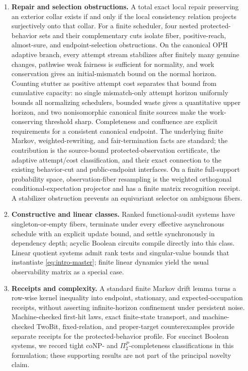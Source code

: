 \documentclass[11pt]{article}
\theoremstyle{definition}
\theoremstyle{remark}
\numberwithin{equation}{section}
\begin{document}
\begin{enumerate}[label=\textbf{C\arabic*.},leftmargin=3.2em]
\item \textbf{Repair and selection obstructions.}
A total exact local repair preserving an exterior collar exists if and only if the local consistency relation projects surjectively onto that collar.  For a finite scheduler, four nested protected-behavior sets and their complementary cuts isolate fiber, positive-reach, almost-sure, and endpoint-selection obstructions.  On the canonical OPH adaptive branch, every attempt stream stabilizes after finitely many genuine changes, pathwise weak fairness is sufficient for normality, and work conservation gives an initial-mismatch bound on the normal horizon.  Counting stutter as positive attempt cost separates that bound from cumulative capacity: no single mismatch-only attempt horizon uniformly bounds all normalizing schedulers, bounded waste gives a quantitative upper horizon, and two nonisomorphic canonical finite sources make the work-conserving threshold sharp.  Completeness and confluence are explicit requirements for a consistent canonical endpoint.  The underlying finite Markov, weighted-rewriting, and fair-termination facts are standard; the contribution is the source-bound protected-observation certificate, the adaptive attempt/cost classification, and their exact connection to the existing behavior-cut and public-endpoint interfaces.  On a finite full-support probability space, observation-fiber resampling is the weighted orthogonal conditional-expectation projector and has a finite matrix recognition receipt.  A stabilizer obstruction prevents an equivariant selector on ambiguous fibers.

\item \textbf{Constructive and linear classes.}
Ranked functional-audit systems have singleton-or-empty fibers, terminate under every effective asynchronous schedule with an explicit update bound, and settle synchronously in dependency depth; acyclic Boolean circuits compile directly into this class.  Linear quotient systems admit rank tests and singular-value bounds that instantiate \eqref{eq:intro-master}; finite linear dynamics yield the usual observability matrix as a special case.

\item \textbf{Receipts and complexity.}
A standard finite Markov drift lemma turns a row-wise kernel inequality into endpoint, stationary, and expected-occupation receipts, without asserting infinite-horizon confinement under persistent noise.  Machine-checked first-hit laws, exact finite-state transport, and machine-checked TwoBit, fixed-relation, and proper-target counterexamples provide separate receipts for the protected-behavior profile.  For succinct Boolean systems, we record tight coNP- and $\Pi_2^P$-completeness classifications in this formulation; these supporting results are not part of the principal novelty claim.
\end{enumerate}
\end{document}
